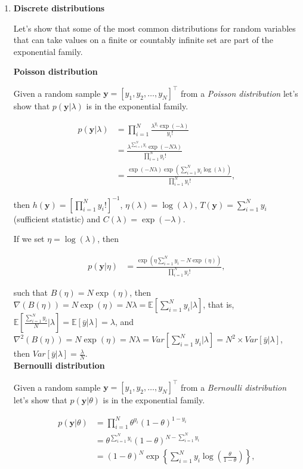 \begin{enumerate}

\item \textbf{Discrete distributions}

Let's show that some of the most common distributions for random variables that can take values on a finite or countably infinite set are part of the exponential family.
 
\textbf{Poisson distribution} 

Given a random sample $\mathbf{y}=[y_1,y_2,\dots,y_N]^{\top}$ from a \textit{Poisson distribution} let's show that $p(\mathbf{y}|\lambda)$ is in the exponential family.

\begin{align}
	p(\mathbf{y}|\lambda)&=\prod_{i=1}^N \frac{\lambda^{y_i} \exp(-\lambda)}{y_i!}\nonumber\\
	&=\frac{\lambda^{\sum_{i=1}^N y_i}\exp(-N\lambda)}{\prod_{i=1}^N y_i!}\nonumber\\
	&=\frac{\exp(-N\lambda)\exp(\sum_{i=1}^Ny_i\log(\lambda))}{\prod_{i=1}^N y_i!}\nonumber,
\end{align}

then $h(\mathbf{y})=\left[\prod_{i=1}^N y_i!\right]^{-1}$, $\eta(\lambda)=\log(\lambda)$, $T(\mathbf{y})=\sum_{i=1}^N y_i$ (sufficient statistic) and $C(\lambda)=\exp(-\lambda)$.

If we set $\eta=\log(\lambda)$, then 

\begin{align}
	p(\mathbf{y}|\eta)&=\frac{\exp(\eta\sum_{i=1}^Ny_i-N\exp(\eta))}{\prod_{i=1}^N y_i!},\nonumber
\end{align}

such that $B(\eta)=N\exp(\eta)$, then $\nabla(B(\eta))=N\exp(\eta)=N\lambda=\mathbb{E}\left[\sum_{i=1}^N y_i\biggr\rvert\lambda\right]$, that is, $\mathbb{E}\left[\frac{\sum_{i=1}^N y_i}{N}\biggr\rvert\lambda\right]=\mathbb{E}[\bar{y}|\lambda]=\lambda$, and $\nabla^2(B(\eta))=N\exp(\eta)=N\lambda=Var\left[\sum_{i=1}^N y_i\biggr\rvert\lambda\right]=N^2 \times Var\left[\bar{y}\rvert\lambda\right]$, then $Var\left[\bar{y}\rvert\lambda\right]=\frac{\lambda}{N}$.\\ 

\textbf{Bernoulli distribution}

Given a random sample $\mathbf{y}=[y_1,y_2,\dots,y_N]^{\top}$ from a \textit{Bernoulli distribution} let's show that $p(\mathbf{y}|\theta)$ is in the exponential family.


\begin{align}
	p(\mathbf{y}|\theta)&=\prod_{i=1}^N \theta^{y_i}(1-\theta)^{1-y_i}\nonumber\\
	&=\theta^{\sum_{i=1}^N y_i}(1-\theta)^{N-\sum_{i=1}^N y_i}\nonumber\\
	&=(1-\theta)^N\exp\left\{\sum_{i=1}^N y_i\log\left(\frac{\theta}{1-\theta}\right)\right\}\nonumber,
\end{align}


\end{enumerate}
